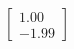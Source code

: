 \documentclass[preview]{standalone}
\begin{document}
\begin{align*}
\begin{bmatrix} 1.00 \\ -1.99 \end{bmatrix}
\end{align*}
\end{document}
